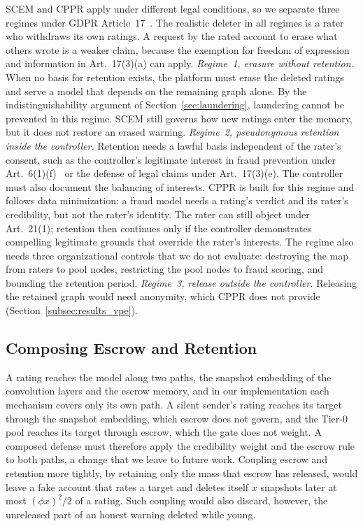 \documentclass[lettersize,journal]{IEEEtran}
\begin{document}
SCEM and CPPR apply under different legal conditions, so we separate three regimes under GDPR Article~17~\cite{gdpr2016}.
The realistic deleter in all regimes is a rater who withdraws its own ratings. A request by the rated account to erase what others wrote is a weaker claim, because the exemption for freedom of expression and information in Art.~17(3)(a) can apply.
\emph{Regime~1, erasure without retention.}
When no basis for retention exists, the platform must erase the deleted ratings and serve a model that depends on the remaining graph alone.
By the indistinguishability argument of Section~\ref{sec:laundering}, laundering cannot be prevented in this regime. SCEM still governs how new ratings enter the memory, but it does not restore an erased warning.
\emph{Regime~2, pseudonymous retention inside the controller.}
Retention needs a lawful basis independent of the rater's consent, such as the controller's legitimate interest in fraud prevention under Art.~6(1)(f)~\cite{edpb2024legit} or the defense of legal claims under Art.~17(3)(e). The controller must also document the balancing of interests.
CPPR is built for this regime and follows data minimization: a fraud model needs a rating's verdict and its rater's credibility, but not the rater's identity.
The rater can still object under Art.~21(1); retention then continues only if the controller demonstrates compelling legitimate grounds that override the rater's interests.
The regime also needs three organizational controls that we do not evaluate: destroying the map from raters to pool nodes, restricting the pool nodes to fraud scoring, and bounding the retention period.
\emph{Regime~3, release outside the controller.}
Releasing the retained graph would need anonymity, which CPPR does not provide (Section~\ref{subsec:results_vpe}).

\subsection{Composing Escrow and Retention}
\label{subsec:composition}

A rating reaches the model along two paths, the snapshot embedding of the convolution layers and the escrow memory, and in our implementation each mechanism covers only its own path.
A silent sender's rating reaches its target through the snapshot embedding, which escrow does not govern, and the Tier-$0$ pool reaches its target through escrow, which the gate does not weight.
A composed defense must therefore apply the credibility weight and the escrow rule to both paths, a change that we leave to future work.
Coupling escrow and retention more tightly, by retaining only the mass that escrow has released, would leave a fake account that rates a target and deletes itself $x$ snapshots later at most $(\phi x)^2/2$ of a rating. Such coupling would also discard, however, the unreleased part of an honest warning deleted while young.
\end{document}
